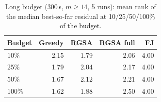 \begin{table}[t]
\centering
\small
\caption{Long budget (300\,s, $m\ge14$, 5 runs): mean rank of the median best-so-far residual at 10/25/50/100\% of the budget.}\label{tab:long}
\begin{tabular}{lrrrr}
\toprule
Budget & Greedy & RGSA & RGSA full & FJ \\
\midrule
10\% & 2.15 & 1.79 & 2.06 & 4.00 \\
25\% & 1.79 & 2.04 & 2.17 & 4.00 \\
50\% & 1.67 & 2.12 & 2.21 & 4.00 \\
100\% & 1.62 & 1.88 & 2.50 & 4.00 \\
\bottomrule
\end{tabular}
\end{table}

